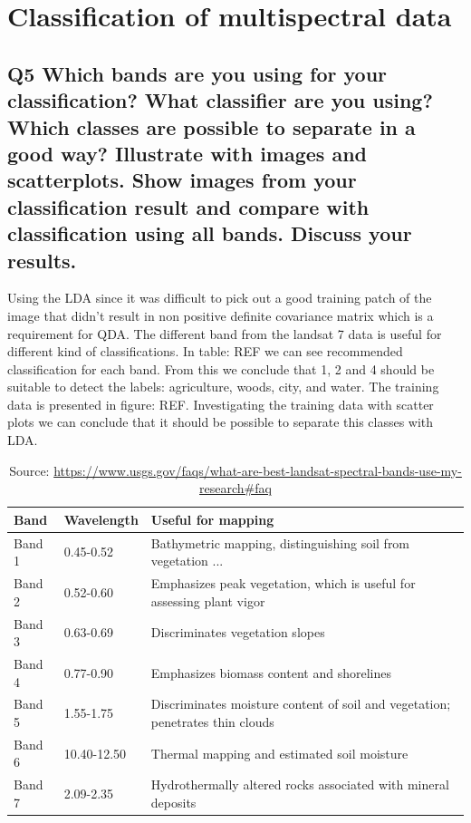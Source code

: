 \documentclass[oneside,a4paper]{article}
\begin{document}
\section{Classification of multispectral data}

\subsection*{Q5 Which bands are you using for your classification? What classifier are you using? Which classes are possible to separate in a good way? Illustrate with images and scatterplots. Show images from your classification result and compare with classification using all bands. Discuss your results.}

\noindent Using the LDA since it was difficult to pick out a good training patch of the image that didn't result in non positive definite covariance matrix which is a requirement for QDA. The different band from the landsat 7 data is useful for different kind of classifications. In table: REF we can see  recommended classification for each band. From this we conclude that 1, 2 and 4 should be suitable to detect the labels: agriculture, woods, city, and water. The training data is presented in figure: REF. Investigating the training data with scatter plots we can conclude that it should be possible to separate this classes with LDA. 


\begin{table}[ht!]
\begin{tabular}{@{}lll@{}}
\toprule
\textbf{Band} & \textbf{Wavelength} & \textbf{Useful for mapping}                                                   \\ \midrule
Band 1        & 0.45-0.52           & Bathymetric mapping, distinguishing soil from vegetation ...                  \\
Band 2        & 0.52-0.60           & Emphasizes peak vegetation, which is useful for assessing plant vigor         \\
Band 3        & 0.63-0.69           & Discriminates vegetation slopes                                               \\
Band 4        & 0.77-0.90           & Emphasizes biomass content and shorelines                                     \\
Band 5        & 1.55-1.75           & Discriminates moisture content of soil and vegetation; penetrates thin clouds \\
Band 6        & 10.40-12.50         & Thermal mapping and estimated soil moisture                                   \\
Band 7        & 2.09-2.35           & Hydrothermally altered rocks associated with mineral deposits                 \\ \bottomrule
\end{tabular}
\caption{Source: \url{https://www.usgs.gov/faqs/what-are-best-landsat-spectral-bands-use-my-research\#faq}}
\end{table}
\end{document}
